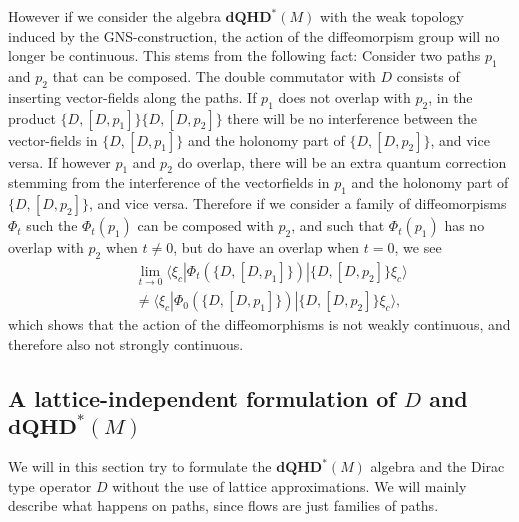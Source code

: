 \documentclass[12pt]{article}
\begin{document}
However if we consider the algebra $\mathbf{dQHD}^*(M)$ with the weak topology induced by the GNS-construction, the action of the diffeomorpism group will no longer be continuous. This stems from the following fact: Consider two paths $p_1$ and $p_2$ that can be composed. The double commutator with $D$ consists of inserting vector-fields along the paths. If $p_1$ does not overlap with $p_2$, in the product $\{ D,[D,p_1]\} \{ D,[D,p_2]\}  $ there will be no interference between the vector-fields in $\{ D,[D,p_1]\}$ and the holonomy part of $\{ D,[D,p_2]\}$, and vice versa. If however $p_1$ and $p_2$ do overlap, there will be an extra quantum correction stemming from the interference of the vectorfields in $p_1$ and the holonomy part of $\{ D,[D,p_2]\}$, and vice versa. Therefore if we consider a family of diffeomorpisms $\Phi_t$ such the $\Phi_t (p_1)$ can be composed with $p_2$, and such that $\Phi_t (p_1)$ has no overlap with $p_2$ when $t\not=0$, but do have an overlap when $t=0$, we see
\begin{eqnarray*}
&& \lim_{t\to 0} \langle\xi_c | \Phi_t (\{ D,[D,p_1]\})| \{ D,[D,p_2]\}\xi_c \rangle \\
 &&\not= \langle \xi_c | \Phi_0 (\{ D,[D,p_1]\})| \{ D,[D,p_2]\}\xi_c \rangle ,
\end{eqnarray*}
which shows that the action of the diffeomorphisms is not weakly continuous, and therefore also not strongly continuous.











\subsection{A lattice-independent formulation of $D$ and $\mathbf{dQHD}^*(M)$ }


We will in this section try to formulate the $\mathbf{dQHD}^*(M)$ algebra and the Dirac type operator $D$ without the use of lattice approximations.  We will mainly describe what happens on paths, since flows are just families of paths. 
\end{document}
